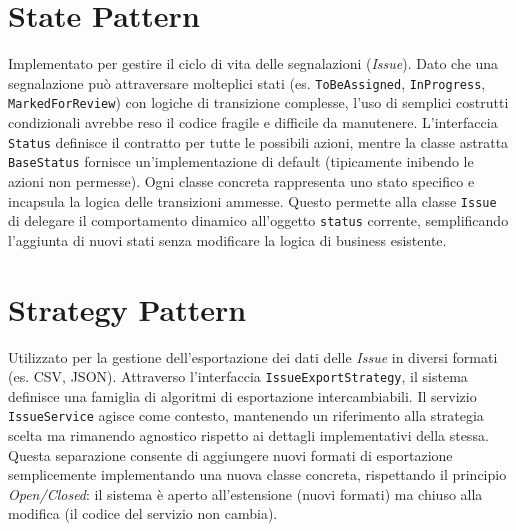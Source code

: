 \section{State Pattern}
    Implementato per gestire il ciclo di vita delle segnalazioni (\textit{Issue}). Dato che una segnalazione può attraversare molteplici stati (es. \texttt{ToBeAssigned}, \texttt{InProgress}, \texttt{MarkedForReview}) con logiche di transizione complesse, l'uso di semplici costrutti condizionali avrebbe reso il codice fragile e difficile da manutenere. 
    L'interfaccia \texttt{Status} definisce il contratto per tutte le possibili azioni, mentre la classe astratta \texttt{BaseStatus} fornisce un'implementazione di default (tipicamente inibendo le azioni non permesse). Ogni classe concreta rappresenta uno stato specifico e incapsula la logica delle transizioni ammesse. Questo permette alla classe \texttt{Issue} di delegare il comportamento dinamico all'oggetto \texttt{status} corrente, semplificando l'aggiunta di nuovi stati senza modificare la logica di business esistente.

\section{Strategy Pattern}
    Utilizzato per la gestione dell'esportazione dei dati delle \textit{Issue} in diversi formati (es. CSV, JSON). Attraverso l'interfaccia \texttt{IssueExportStrategy}, il sistema definisce una famiglia di algoritmi di esportazione intercambiabili. Il servizio \texttt{IssueService} agisce come contesto, mantenendo un riferimento alla strategia scelta ma rimanendo agnostico rispetto ai dettagli implementativi della stessa. Questa separazione consente di aggiungere nuovi formati di esportazione semplicemente implementando una nuova classe concreta, rispettando il principio \textit{Open/Closed}: il sistema è aperto all'estensione (nuovi formati) ma chiuso alla modifica (il codice del servizio non cambia).
